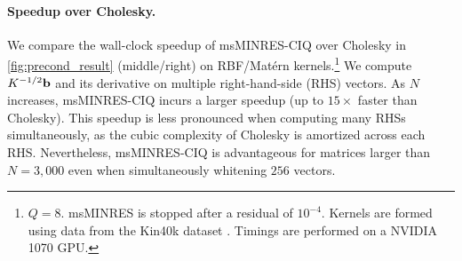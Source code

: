 \paragraph{Speedup over Cholesky.}
We compare the wall-clock speedup of msMINRES-CIQ over Cholesky in \cref{fig:precond_result} (middle/right) on RBF/Mat\'ern kernels.\footnote{
  $Q=8$.
  msMINRES is stopped after a residual of $10^{-4}$.
  Kernels are formed using data from the Kin40k dataset \citep{asuncion2007uci}.
  Timings are performed on a NVIDIA 1070 GPU.
}
We compute $K^{-1/2} \mathbf{b}$ and its derivative on multiple right-hand-side (RHS) vectors.
As $N$ increases, msMINRES-CIQ incurs a larger speedup (up to $15\times$ faster than Cholesky).
This speedup is less pronounced when computing many RHSs simultaneously, as the cubic complexity of Cholesky is amortized across each RHS.
Nevertheless, msMINRES-CIQ is advantageous for matrices larger than $N=3,\!000$ even when simultaneously whitening $256$ vectors.
